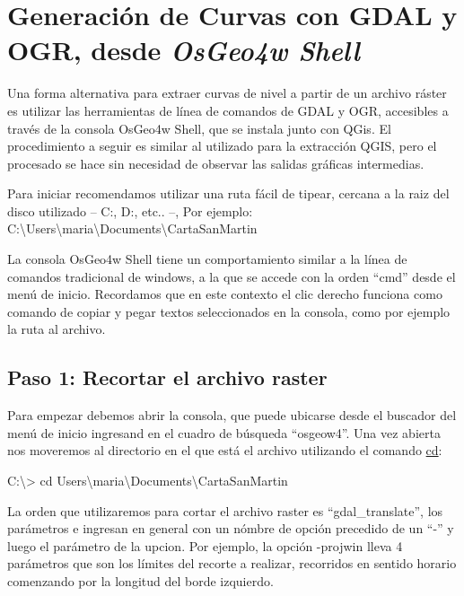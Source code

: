 \documentclass[12pt,]{extarticle}
\begin{document}
\hypertarget{generaciuxf3n-de-curvas-con-gdal-y-ogr-desde-osgeo4w-shell}{%
\section{\texorpdfstring{Generación de Curvas con GDAL y OGR, desde
\emph{OsGeo4w
Shell}}{Generación de Curvas con GDAL y OGR, desde OsGeo4w Shell}}\label{generaciuxf3n-de-curvas-con-gdal-y-ogr-desde-osgeo4w-shell}}

Una forma alternativa para extraer curvas de nivel a partir de un
archivo ráster es utilizar las herramientas de línea de comandos de GDAL
y OGR, accesibles a través de la consola OsGeo4w Shell, que se instala
junto con QGis. El procedimiento a seguir es similar al utilizado para
la extracción QGIS, pero el procesado se hace sin necesidad de observar
las salidas gráficas intermedias.

Para iniciar recomendamos utilizar una ruta fácil de tipear, cercana a
la raiz del disco utilizado -- C:, D:, etc.. --, Por ejemplo:
C:\textbackslash{}Users\textbackslash{}maria\textbackslash{}Documents\textbackslash{}CartaSanMartin

La consola OsGeo4w Shell tiene un comportamiento similar a la línea de
comandos tradicional de windows, a la que se accede con la orden ``cmd''
desde el menú de inicio. Recordamos que en este contexto el clic derecho
funciona como comando de copiar y pegar textos seleccionados en la
consola, como por ejemplo la ruta al archivo.

\hypertarget{paso-1-recortar-el-archivo-raster}{%
\subsection{Paso 1: Recortar el archivo
raster}\label{paso-1-recortar-el-archivo-raster}}

Para empezar debemos abrir la consola, que puede ubicarse desde el
buscador del menú de inicio ingresand en el cuadro de búsqueda
``osgeow4''. Una vez abierta nos moveremos al directorio en el que está
el archivo utilizando el comando
\href{https://www.computerhope.com/cdhlp.htm}{cd}:

C:\textbackslash{}\textgreater{} cd
Users\textbackslash{}maria\textbackslash{}Documents\textbackslash{}CartaSanMartin

La orden que utilizaremos para cortar el archivo raster es
``gdal\_translate'', los parámetros e ingresan en general con un nómbre
de opción precedido de un ``-'' y luego el parámetro de la upcion. Por
ejemplo, la opción -projwin lleva 4 parámetros que son los límites del
recorte a realizar, recorridos en sentido horario comenzando por la
longitud del borde izquierdo.
\end{document}
